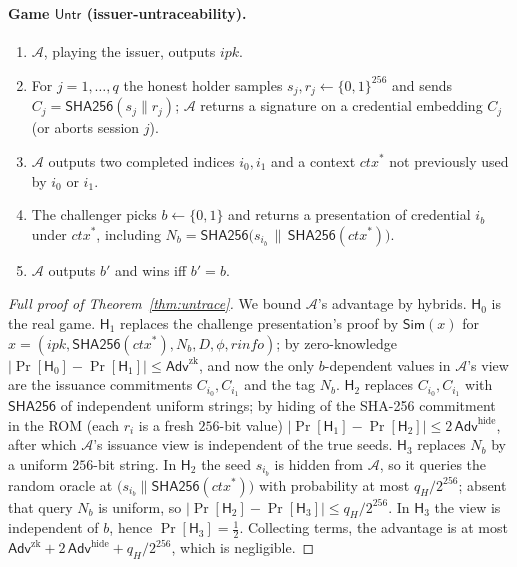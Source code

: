 \documentclass[11pt]{article}
\theoremstyle{plain}
\theoremstyle{definition}
\begin{document}
\paragraph{Game $\mathsf{Untr}$ (issuer-untraceability).}
\begin{enumerate}
\item $\mathcal{A}$, playing the issuer, outputs $\mathit{ipk}$.
\item For $j=1,\dots,q$ the honest holder samples $s_j,r_j\gets\{0,1\}^{256}$ and sends $C_j=\mathsf{SHA256}(s_j\|r_j)$; $\mathcal{A}$ returns a signature on a credential embedding $C_j$ (or aborts session $j$).
\item $\mathcal{A}$ outputs two completed indices $i_0,i_1$ and a context $\mathit{ctx}^*$ not previously used by $i_0$ or $i_1$.
\item The challenger picks $b\gets\{0,1\}$ and returns a presentation of credential $i_b$ under $\mathit{ctx}^*$, including $N_b=\mathsf{SHA256}\!\big(s_{i_b}\,\|\,\mathsf{SHA256}(\mathit{ctx}^*)\big)$.
\item $\mathcal{A}$ outputs $b'$ and wins iff $b'=b$.
\end{enumerate}

\begin{proof}[Full proof of Theorem~\ref{thm:untrace}]
We bound $\mathcal{A}$'s advantage by hybrids.
$\mathsf{H}_0$ is the real game.
$\mathsf{H}_1$ replaces the challenge presentation's proof by $\mathsf{Sim}(x)$ for
$x=(\mathit{ipk},\mathsf{SHA256}(\mathit{ctx}^*),N_b,D,\phi,\mathit{rinfo})$; by
zero-knowledge $|\Pr[\mathsf{H}_0]-\Pr[\mathsf{H}_1]|\le\mathsf{Adv}^{\mathrm{zk}}$, and
now the only $b$-dependent values in $\mathcal{A}$'s view are the issuance commitments
$C_{i_0},C_{i_1}$ and the tag $N_b$.
$\mathsf{H}_2$ replaces $C_{i_0},C_{i_1}$ with $\mathsf{SHA256}$ of independent uniform
strings; by hiding of the SHA-256 commitment in the ROM (each $r_i$ is a fresh $256$-bit
value) $|\Pr[\mathsf{H}_1]-\Pr[\mathsf{H}_2]|\le 2\,\mathsf{Adv}^{\mathrm{hide}}$, after
which $\mathcal{A}$'s issuance view is independent of the true seeds.
$\mathsf{H}_3$ replaces $N_b$ by a uniform $256$-bit string. In $\mathsf{H}_2$ the seed
$s_{i_b}$ is hidden from $\mathcal{A}$, so it queries the random oracle at
$\big(s_{i_b}\|\mathsf{SHA256}(\mathit{ctx}^*)\big)$ with probability at most
$q_H/2^{256}$; absent that query $N_b$ is uniform, so
$|\Pr[\mathsf{H}_2]-\Pr[\mathsf{H}_3]|\le q_H/2^{256}$. In $\mathsf{H}_3$ the view is
independent of $b$, hence $\Pr[\mathsf{H}_3]=\tfrac12$. Collecting terms, the advantage
is at most $\mathsf{Adv}^{\mathrm{zk}}+2\,\mathsf{Adv}^{\mathrm{hide}}+q_H/2^{256}$,
which is negligible.
\end{proof}



\end{document}
